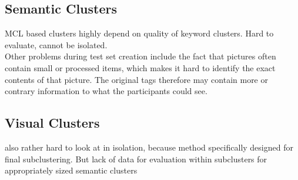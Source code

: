 \subsection{Semantic Clusters}
MCL based clusters highly depend on quality of keyword clusters. Hard to evaluate, cannot be isolated.\\
Other problems during test set creation include the fact that pictures often contain small or processed items, which makes it hard to identify the exact contents of that picture. The original tags therefore may contain more or contrary information to what the participants could see. 

\subsection{Visual Clusters}
also rather hard to look at in isolation, because method specifically designed for final subclustering. But lack of data for evaluation within subclusters for appropriately sized semantic clusters
